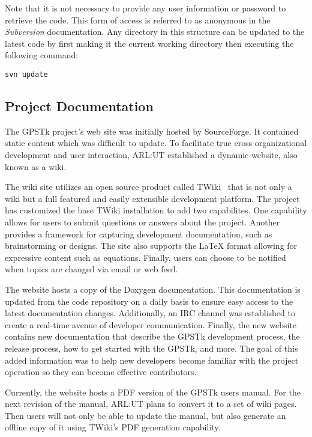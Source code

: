 \documentclass[letterpaper,ugly,10pt]{ion-gps}
\newcommand{\gpstkapp}[1]{\textit{\mbox{#1}}}
\begin{document}
Note that it is not necessary to provide any user information or password to retrieve the code.
This form of access is referred to as anonymous in the \gpstkapp{Subversion} documentation.
Any directory in this structure can be updated to the latest code by first making it the 
current working directory then executing the following command:

\begin{scriptsize}
\begin{lstlisting}
svn update
\end{lstlisting}
\end{scriptsize}


\subsection*{Project Documentation} 

The GPSTk project's web site was initially hosted by SourceForge. It contained static content which was difficult to update. To facilitate true cross organizational development and user interaction, ARL:UT established a dynamic website, also known as a wiki.

The wiki site utilizes an open source product called \mbox{TWiki \cite{twiki}} that is not only a wiki but a full featured and easily extensible development platform. The project has customized the base TWiki installation to add two capabilites. One capability allows for users to submit questions or answers about the project. Another provides a framework for capturing development documentation, such as brainstorming or designs. The site also supports the \LaTeX \vspace{1mm} format allowing for expressive content such as equations. Finally, users can choose to be notified when topics are changed via email or web feed.

The website hosts a copy of the Doxygen documentation.  This documentation  is updated from the code repository on a daily basis to ensure easy access to the latest documentation changes.  Additionally, an IRC channel was established to create a real-time avenue of developer communication.  Finally, the new website contains new documentation that describe the GPSTk development process, the release process, how to get started with the GPSTk, and more.  The goal of this added information was to help new developers become familiar with the project operation so they can become effective contributors.

Currently, the website hosts a PDF version of the GPSTk users manual.  For the next revision of the manual, ARL:UT plans to convert it to a set of wiki pages. Then users will not only be able to update the manual, but also generate an offline copy of it using TWiki's PDF generation capability.
\end{document}
